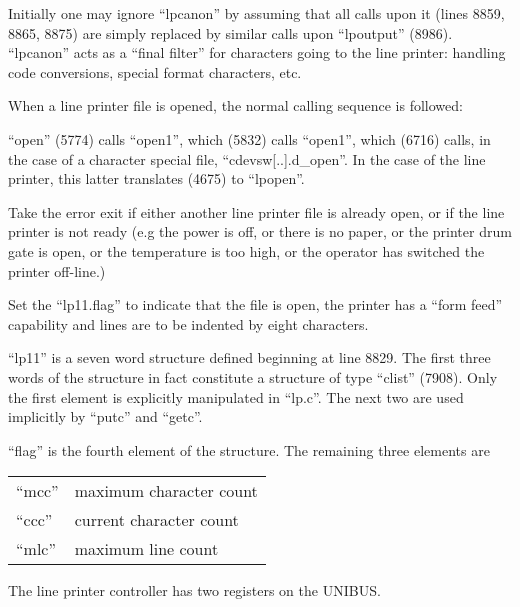 Initially one may ignore ``lpcanon'' by
assuming that all calls upon it (lines
8859, 8865, 8875) are simply replaced
by similar calls upon ``lpoutput''
(8986). ``lpcanon'' acts as a ``final
filter'' for characters going to the
line printer: handling code conversions, special format characters, etc.


When a line printer file is opened, the
normal calling sequence is followed:

``open'' (5774) calls ``open1'',
which (5832) calls ``open1'', which
(6716) calls, in the case of a
character      special      file,
``cdevsw[..].d\_open''. In the case
of the line printer, this latter
translates (4675) to ``lpopen''.

\bd
\item[8853:] Take the error exit if either
another line printer file is
already open, or if the line
printer is not ready (e.g the
power is off, or there is no
paper, or the printer drum gate
is open, or the temperature is
too high, or the operator has
switched the printer off-line.)

\item[8857:] Set the ``lp11.flag'' to indicate
that the file is open, the
printer has a ``form feed'' capability and lines are to be
indented by eight characters.
\ed


\bd
\item[(a)] ``lp11'' is a seven word structure
defined beginning at line 8829. The
first three words of the structure in
fact constitute a structure of type
``clist'' (7908). Only the first element
is explicitly manipulated in ``lp.c''.
The next two are used implicitly by
``putc'' and ``getc''.

\item[(b)] ``flag'' is the fourth element of
the structure. The remaining three elements are

\begin{tabular}{ll} \\
``mcc'' &      maximum character count\\
``ccc'' &     current character count\\
``mlc'' &     maximum line count\\
\end{tabular}

\bigskip

\item[(c)] The line printer controller has
two registers on the UNIBUS.
\ed

